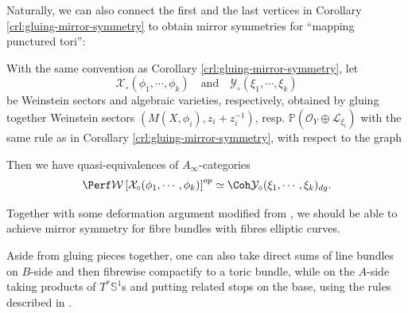 Naturally, we can also connect the first and the last vertices in Corollary \ref{crl:gluing-mirror-symmetry} to obtain mirror symmetries for ``mapping punctured tori'':
\begin{crl}\label{crl:gluing-mirror-symmetry-circ}
    With the same convention as Corollary \ref{crl:gluing-mirror-symmetry}, let \[
        \mathcal{X}_{\circ} (\phi_1,\dotsb,\phi_k)\quad\text{and}\quad\mathcal{Y}_{\circ} (\xi_1,\dotsb,\xi_k)
    \]be Weinstein sectors and algebraic varieties, respectively, obtained by gluing together Weinstein sectors $(M(X,\phi_i),z_i+z_i^{-1})$, resp. $\mathbb{P} (\mathcal{O}_Y\oplus\mathcal{L}_{\xi_i})$ with the same rule as in Corollary \ref{crl:gluing-mirror-symmetry}, with respect to the graph
    \begin{center}
\end{center}
Then we have quasi-equivalences of $A_{\infty}$-categories \[
    \Perf\mathcal{W}\left[\mathcal{X}_{\circ} (\phi_1,\dotsb,\phi_k)\right]^{op}\simeq\Coh\mathcal{Y}_{\circ} (\xi_1,\dotsb,\xi_k)_{dg}.
\]
\end{crl}
Together with some deformation argument modified from \cite{LK17}, we should be able to achieve mirror symmetry for fibre bundles with fibres elliptic curves.\par
Aside from gluing pieces together, one can also take direct sums of line bundles on $B$-side and then fibrewise compactify to a toric bundle, while on the $A$-side taking products of $T^{\ast}\mathbb{S}^1$s and putting related stops on the base, using the rules described in \cite{FLTZ12,Kuwagaki20}.\par
